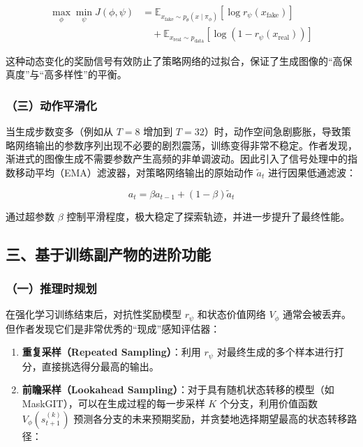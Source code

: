\[
\begin{aligned}
\max_\phi \min_\psi J(\phi, \psi)
&= \mathbb{E}_{x_{\mathrm{fake}} \sim p_\theta(x \mid \pi_\phi)}
\left[\log r_\psi(x_{\mathrm{fake}})\right] \\
&\quad + \mathbb{E}_{x_{\mathrm{real}} \sim p_{\mathrm{data}}}
\left[\log(1 - r_\psi(x_{\mathrm{real}}))\right]
\end{aligned}
\]

这种动态变化的奖励信号有效防止了策略网络的过拟合，保证了生成图像的``高保真度''与``高多样性''的平衡。

\hypertarget{ux4e09ux52a8ux4f5cux5e73ux6ed1ux5316}{%
\subsubsection{（三）动作平滑化}\label{ux4e09ux52a8ux4f5cux5e73ux6ed1ux5316}}

当生成步数变多（例如从 \(T = 8\) 增加到 \(T = 32\)）时，动作空间急剧膨胀，导致策略网络输出的参数序列出现不必要的剧烈震荡，训练变得非常不稳定。作者发现，渐进式的图像生成不需要参数产生高频的非单调波动。因此引入了信号处理中的指数移动平均（EMA）滤波器，对策略网络输出的原始动作 \(\tilde{a}_t\) 进行因果低通滤波：

\[
a_t = \beta a_{t-1} + (1 - \beta)\tilde{a}_t
\]

通过超参数 \(\beta\) 控制平滑程度，极大稳定了探索轨迹，并进一步提升了最终性能。

\hypertarget{ux4e09ux57faux4e8eux8badux7ec3ux526fux4ea7ux7269ux7684ux8fdbux9636ux529fux80fd}{%
\subsection{三、基于训练副产物的进阶功能}\label{ux4e09ux57faux4e8eux8badux7ec3ux526fux4ea7ux7269ux7684ux8fdbux9636ux529fux80fd}}

\hypertarget{ux4e00ux63a8ux7406ux65f6ux89c4ux5212}{%
\subsubsection{（一）推理时规划}\label{ux4e00ux63a8ux7406ux65f6ux89c4ux5212}}

在强化学习训练结束后，对抗性奖励模型 \(r_\psi\) 和状态价值网络 \(V_\phi\) 通常会被丢弃。但作者发现它们是非常优秀的``现成''感知评估器：

\begin{enumerate}
\def\labelenumi{\arabic{enumi}.}
\tightlist
\item
  \textbf{重复采样（Repeated Sampling）}：利用 \(r_\psi\) 对最终生成的多个样本进行打分，直接挑选得分最高的输出。
\item
  \textbf{前瞻采样（Lookahead Sampling）}：对于具有随机状态转移的模型（如 MaskGIT），可以在生成过程的每一步采样 \(K\) 个分支，利用价值函数 \(V_\phi(s_{t+1}^{(k)})\) 预测各分支的未来预期奖励，并贪婪地选择期望最高的状态转移路径：
\end{enumerate}

